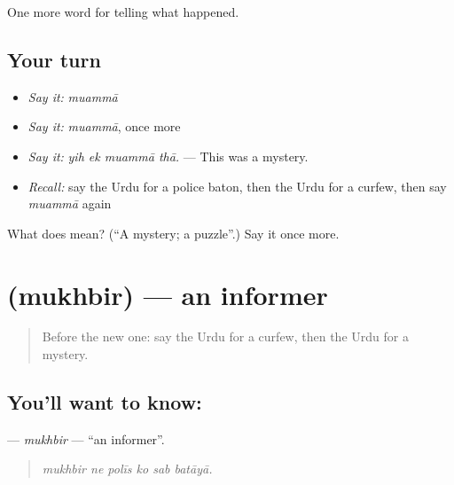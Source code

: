 \begin{grammarlens}[title={What you've built}]
One more word for telling what happened.
\end{grammarlens}

\subsection*{Your turn}
\begin{itemize}
\raggedright
  \item \emph{Say it:} \emph{muammā}
  \item \emph{Say it:} \emph{muammā}, once more
  \item \emph{Say it:} \emph{yih ek muammā thā.} — This was a mystery.
  \item \emph{Recall:} say the Urdu for a police baton, then the Urdu for a curfew, then say \emph{muammā} again
\end{itemize}

\begin{tcolorbox}[breakable,colback=teal!4,colframe=teal!35!black,title={Before you move on}]
What does  mean? (\textquotedblleft{}A mystery; a puzzle\textquotedblright{}.) Say it once more.
\end{tcolorbox}
\section[\texorpdfstring{\ur{مخبر} (mukhbir)}{مخبر (mukhbir)}]{ (mukhbir) — an informer}

\label{lesson:UR-C305-mukhbir}



\begin{quote}
Before the new one: say the Urdu for a curfew, then the Urdu for a mystery.
\end{quote}

\subsection*{You'll want to know: }
\textbf{} — \emph{mukhbir} — \textquotedblleft{}an informer\textquotedblright{}.

\begin{quote}
     
\end{quote}

\begin{quote}
\emph{mukhbir ne polīs ko sab batāyā.}
\end{quote}

